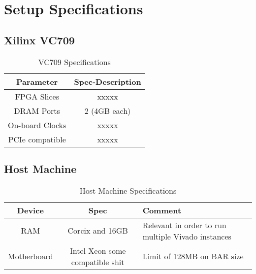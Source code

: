 \chapter{Setup Specifications}

\section{Xilinx VC709}

\begin{table}[H]
\centering
\begin{tabular}{c | c}
\hline
Parameter & Spec-Description\\
\hline
FPGA Slices & xxxxx \\
DRAM Ports & 2 (4GB each) \\
On-board Clocks & xxxxx \\
PCIe compatible & xxxxx
\end{tabular}
\caption{VC709 Specifications}
\end{table}

\section{Host Machine}

\begin{table}[H]
\centering
\begin{tabular}{c | c | p{}}
\hline
Device & Spec & Comment \\
\hline
RAM & Corcix and 16GB & Relevant in order to run multiple Vivado instances\\
Motherboard & Intel Xeon some compatible shit & Limit of 128MB on BAR size\\ 
\end{tabular}
\caption{Host Machine Specifications}
\end{table}
